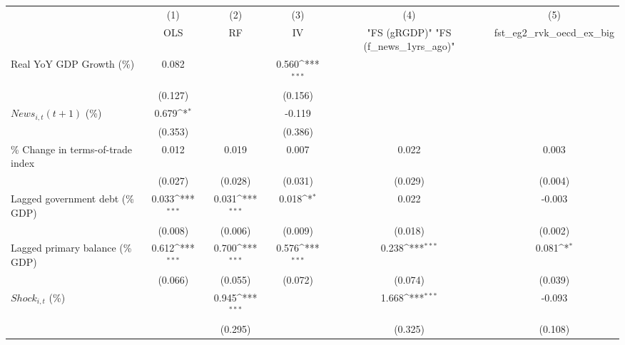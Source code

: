 {
\def\sym#1{\ifmmode^{#1}\else\(^{#1}\)\fi}
\begin{tabular}{l*{5}{c}}
\toprule
                    &\multicolumn{1}{c}{(1)}&\multicolumn{1}{c}{(2)}&\multicolumn{1}{c}{(3)}&\multicolumn{1}{c}{(4)}&\multicolumn{1}{c}{(5)}\\
                    &\multicolumn{1}{c}{OLS}&\multicolumn{1}{c}{RF}&\multicolumn{1}{c}{IV}&\multicolumn{1}{c}{ "FS (gRGDP)"  "FS (f_news_1yrs_ago)" }&\multicolumn{1}{c}{fst_eg2_rvk_oecd_ex_big}\\
\midrule
Real YoY GDP Growth (\%)&       0.082         &                     &       0.560\sym{***}&                     &                     \\
                    &     (0.127)         &                     &     (0.156)         &                     &                     \\
\addlinespace
$ News_{i,t}(t+1)$ (\%)&       0.679\sym{*}  &                     &      -0.119         &                     &                     \\
                    &     (0.353)         &                     &     (0.386)         &                     &                     \\
\addlinespace
\% Change in terms-of-trade index&       0.012         &       0.019         &       0.007         &       0.022         &       0.003         \\
                    &     (0.027)         &     (0.028)         &     (0.031)         &     (0.029)         &     (0.004)         \\
\addlinespace
Lagged government debt (\% GDP)&       0.033\sym{***}&       0.031\sym{***}&       0.018\sym{*}  &       0.022         &      -0.003         \\
                    &     (0.008)         &     (0.006)         &     (0.009)         &     (0.018)         &     (0.002)         \\
\addlinespace
Lagged primary balance (\% GDP)&       0.612\sym{***}&       0.700\sym{***}&       0.576\sym{***}&       0.238\sym{***}&       0.081\sym{*}  \\
                    &     (0.066)         &     (0.055)         &     (0.072)         &     (0.074)         &     (0.039)         \\
\addlinespace
$ Shock_{i,t}$ (\%) &                     &       0.945\sym{***}&                     &       1.668\sym{***}&      -0.093         \\
                    &                     &     (0.295)         &                     &     (0.325)         &     (0.108)         \\

\end{tabular}}
